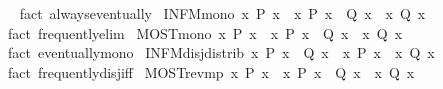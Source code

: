 \begin{isabellebody}
\isadelimproof
\ %
\endisadelimproof
%
\isatagproof
{}\isamarkupfalse%
\ {\isacharparenleft}fact\ always{\isacharunderscore}eventually{\isacharparenright}%
\endisatagproof
{\isafoldproof}%
%
\isadelimproof
%
\endisadelimproof
\isanewline
{}\isamarkupfalse%
\ INFM{\isacharunderscore}mono{\isacharcolon}\ {\isachardoublequoteopen}{\isasymexists}\isactrlsub {\isasyminfinity}x{\isachardot}\ P\ x\ {\isasymLongrightarrow}\ {\isacharparenleft}{\isasymAnd}x{\isachardot}\ P\ x\ {\isasymLongrightarrow}\ Q\ x{\isacharparenright}\ {\isasymLongrightarrow}\ {\isasymexists}\isactrlsub {\isasyminfinity}x{\isachardot}\ Q\ x{\isachardoublequoteclose}%
\isadelimproof
\ %
\endisadelimproof
%
\isatagproof
{}\isamarkupfalse%
\ {\isacharparenleft}fact\ frequently{\isacharunderscore}elim{}{\isacharparenright}%
\endisatagproof
{\isafoldproof}%
%
\isadelimproof
%
\endisadelimproof
\isanewline
{}\isamarkupfalse%
\ MOST{\isacharunderscore}mono{\isacharcolon}\ {\isachardoublequoteopen}{\isasymforall}\isactrlsub {\isasyminfinity}x{\isachardot}\ P\ x\ {\isasymLongrightarrow}\ {\isacharparenleft}{\isasymAnd}x{\isachardot}\ P\ x\ {\isasymLongrightarrow}\ Q\ x{\isacharparenright}\ {\isasymLongrightarrow}\ {\isasymforall}\isactrlsub {\isasyminfinity}x{\isachardot}\ Q\ x{\isachardoublequoteclose}%
\isadelimproof
\ %
\endisadelimproof
%
\isatagproof
{}\isamarkupfalse%
\ {\isacharparenleft}fact\ eventually{\isacharunderscore}mono{\isacharparenright}%
\endisatagproof
{\isafoldproof}%
%
\isadelimproof
%
\endisadelimproof
\isanewline
{}\isamarkupfalse%
\ INFM{\isacharunderscore}disj{\isacharunderscore}distrib{\isacharcolon}\ {\isachardoublequoteopen}{\isacharparenleft}{\isasymexists}\isactrlsub {\isasyminfinity}x{\isachardot}\ P\ x\ {\isasymor}\ Q\ x{\isacharparenright}\ {\isasymlongleftrightarrow}\ {\isacharparenleft}{\isasymexists}\isactrlsub {\isasyminfinity}x{\isachardot}\ P\ x{\isacharparenright}\ {\isasymor}\ {\isacharparenleft}{\isasymexists}\isactrlsub {\isasyminfinity}x{\isachardot}\ Q\ x{\isacharparenright}{\isachardoublequoteclose}%
\isadelimproof
\ %
\endisadelimproof
%
\isatagproof
{}\isamarkupfalse%
\ {\isacharparenleft}fact\ frequently{\isacharunderscore}disj{\isacharunderscore}iff{\isacharparenright}%
\endisatagproof
{\isafoldproof}%
%
\isadelimproof
%
\endisadelimproof
\isanewline
{}\isamarkupfalse%
\ MOST{\isacharunderscore}rev{\isacharunderscore}mp{\isacharcolon}\ {\isachardoublequoteopen}{\isasymforall}\isactrlsub {\isasyminfinity}x{\isachardot}\ P\ x\ {\isasymLongrightarrow}\ {\isasymforall}\isactrlsub {\isasyminfinity}x{\isachardot}\ P\ x\ {\isasymlongrightarrow}\ Q\ x\ {\isasymLongrightarrow}\ {\isasymforall}\isactrlsub {\isasyminfinity}x{\isachardot}\ Q\ x{\isachardoublequoteclose}%

\end{isabellebody}
